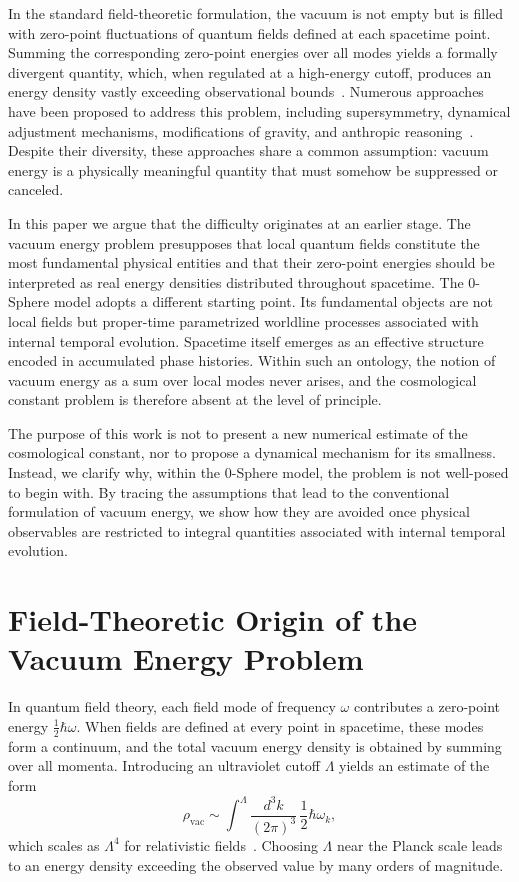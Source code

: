 \documentclass[%
 reprint,
 amsmath,amssymb,
 aps,
 prb,
]{revtex4-2}
\numberwithin{equation}{section}
\begin{document}
In the standard field-theoretic formulation, the vacuum is not empty but is filled with zero-point fluctuations of quantum fields defined at each spacetime point. Summing the corresponding zero-point energies over all modes yields a formally divergent quantity, which, when regulated at a high-energy cutoff, produces an energy density vastly exceeding observational bounds~\cite{BirrellDavies1982,Fulling1989}. Numerous approaches have been proposed to address this problem, including supersymmetry, dynamical adjustment mechanisms, modifications of gravity, and anthropic reasoning~\cite{Weinberg1989,Padmanabhan2003}. Despite their diversity, these approaches share a common assumption: vacuum energy is a physically meaningful quantity that must somehow be suppressed or canceled.

In this paper we argue that the difficulty originates at an earlier stage. The vacuum energy problem presupposes that local quantum fields constitute the most fundamental physical entities and that their zero-point energies should be interpreted as real energy densities distributed throughout spacetime. The 0-Sphere model adopts a different starting point. Its fundamental objects are not local fields but proper-time parametrized worldline processes associated with internal temporal evolution. Spacetime itself emerges as an effective structure encoded in accumulated phase histories. Within such an ontology, the notion of vacuum energy as a sum over local modes never arises, and the cosmological constant problem is therefore absent at the level of principle.

The purpose of this work is not to present a new numerical estimate of the cosmological constant, nor to propose a dynamical mechanism for its smallness. Instead, we clarify why, within the 0-Sphere model, the problem is not well-posed to begin with. By tracing the assumptions that lead to the conventional formulation of vacuum energy, we show how they are avoided once physical observables are restricted to integral quantities associated with internal temporal evolution.

\section{Field-Theoretic Origin of the Vacuum Energy Problem}
\label{sec:field_origin}

In quantum field theory, each field mode of frequency $\omega$ contributes a zero-point energy $\tfrac{1}{2}\hbar\omega$. When fields are defined at every point in spacetime, these modes form a continuum, and the total vacuum energy density is obtained by summing over all momenta. Introducing an ultraviolet cutoff $\Lambda$ yields an estimate of the form
\begin{equation}
\rho_{\mathrm{vac}} \sim \int^{\Lambda} \frac{d^3k}{(2\pi)^3} \, \frac{1}{2}\hbar\omega_k,
\end{equation}
which scales as $\Lambda^4$ for relativistic fields~\cite{Weinberg1989}. Choosing $\Lambda$ near the Planck scale leads to an energy density exceeding the observed value by many orders of magnitude.
\end{document}
